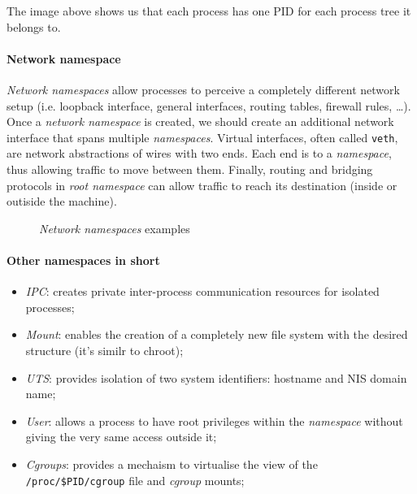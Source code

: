 \begin{note}
    The image above shows us that each process has one PID for each process
    tree it belongs to.
\end{note}

\paragraph{Network namespace}
\emph{Network namespaces} allow processes to perceive a completely different
network setup (i.e. loopback interface, general interfaces, routing tables,
firewall rules, \dots). Once a \emph{network namespace} is created, we should
create an additional  network interface that spans multiple
\emph{namespaces}. Virtual interfaces, often called \texttt{veth}, are network
abstractions of wires with two ends. Each end is  to a
\emph{namespace}, thus allowing traffic to move between them.
Finally, routing and bridging protocols in \emph{root namespace} can allow
traffic to reach its destination (inside or outiside the machine).

\begin{figure}[h!]
    \centering
    \hfill
    \caption{\emph{Network namespaces} examples}
\end{figure}

\paragraph{Other namespaces in short}
\begin{itemize}
    \item \emph{IPC}: creates private inter-process communication resources for
    isolated processes;
    \item \emph{Mount}: enables the creation of a completely new file system
    with the desired structure (it's similr to chroot);
    \item \emph{UTS}: provides isolation of two system identifiers: hostname and
    NIS domain name;
    \item \emph{User}: allows a process to have root privileges within the
    \emph{namespace} without giving the very same access outside it;
    \item \emph{Cgroups}: provides a mechaism to virtualise the view of the
    \texttt{/proc/\$PID/cgroup} file and \emph{cgroup} mounts;
\end{itemize}

